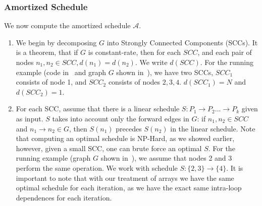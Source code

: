 \subsubsection{Amortized Schedule}
\label{sec:schedule}

We now compute the amortized schedule $\mathcal{A}$. 


\begin{enumerate}


\item We begin by decomposing $G$ into Strongly Connected Components (SCCs). It is a theorem, that if $G$ is constant-rate, 
then for each $\mathit{SCC}$, and each pair of nodes $n_1, n_2 \in \mathit{SCC}, d(n_1) = d(n_2)$. We write $d(\mathit{SCC})$.
For the running example (code in~ and graph $G$ shown in~), we have two SCCs, 
$SCC_1$ consists of node 1, and $SCC_2$ consists of nodes $2,3,4$. $d(\mathit{SCC}_1) = N$ and $d(\mathit{SCC}_2) = 1$.

\item For each SCC, assume that there is a linear schedule $S: P_1 \rightarrow P_2 ... \rightarrow P_k$ given 
as input. $S$ takes into account only the forward edges in $G$: if $n_1, n_2 \in SCC$ and $n_1 \rightarrow n_2 \in G$, 
then $S(n_1)$ precedes $S(n_2)$ in the linear schedule. Note that computing an optimal schedule is NP-Hard, 
as we showed earlier, however, given a small SCC, one can brute force an optimal $S$. For the running example (graph $G$ shown in~), 
we assume that nodes 2 and 3 perform the same operation. We work with schedule 
$S: \{2,3\} \rightarrow \{4\}$. It is important to note that with our treatment of arrays we have the same optimal schedule
for each iteration, as we have the exact same intra-loop dependences for each iteration.



\end{enumerate}
